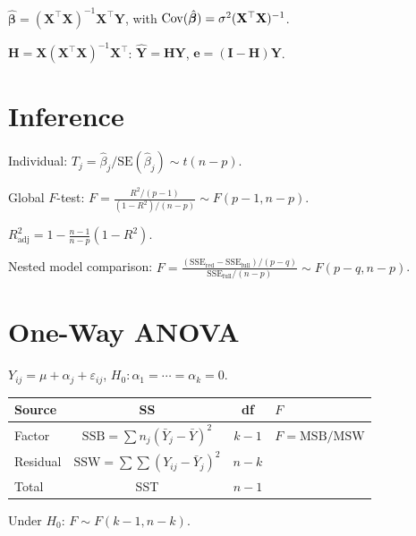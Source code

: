 \begin{theorem}
$\hat{\bm{\beta}} = (\mathbf{X}^\top\mathbf{X})^{-1}\mathbf{X}^\top\mathbf{Y}$, with $\operatorname{Cov}(\hat{\bm{\beta}})=\sigma^2(\mathbf{X}^\top\mathbf{X})^{-1}$.
\end{theorem}

\begin{definition}
$\mathbf{H}=\mathbf{X}(\mathbf{X}^\top\mathbf{X})^{-1}\mathbf{X}^\top$: $\hat{\mathbf{Y}}=\mathbf{H}\mathbf{Y}$, $\mathbf{e}=(\mathbf{I}-\mathbf{H})\mathbf{Y}$.
\end{definition}

\section{Inference}

Individual: $T_j = \hat{\beta}_j/\mathrm{SE}(\hat{\beta}_j) \sim t(n-p)$.

Global $F$-test: $F = \frac{R^2/(p-1)}{(1-R^2)/(n-p)} \sim F(p-1,n-p)$.

\begin{definition}[Adjusted $R^2$]
$R^2_{\mathrm{adj}} = 1-\frac{n-1}{n-p}(1-R^2)$.
\end{definition}

Nested model comparison:
$F = \frac{(\text{SSE}_{\text{red}}-\text{SSE}_{\text{full}})/(p-q)}{\text{SSE}_{\text{full}}/(n-p)} \sim F(p-q,n-p)$.

\section{One-Way ANOVA}

\begin{definition}
$Y_{ij} = \mu + \alpha_j + \varepsilon_{ij}$, $H_0:\alpha_1=\cdots=\alpha_k=0$.
\end{definition}

\begin{theorem}
\begin{center}
\begin{tabular}{lccl}
\toprule
\textbf{Source} & \textbf{SS} & \textbf{df} & \textbf{$F$} \\
\midrule
Factor & $\text{SSB}=\sum n_j(\bar{Y}_j-\bar{Y})^2$ & $k-1$ & $F=\text{MSB}/\text{MSW}$ \\
Residual & $\text{SSW}=\sum\sum(Y_{ij}-\bar{Y}_j)^2$ & $n-k$ & \\
Total & SST & $n-1$ & \\
\bottomrule
\end{tabular}
\end{center}
Under $H_0$: $F\sim F(k-1,n-k)$.
\end{theorem}

